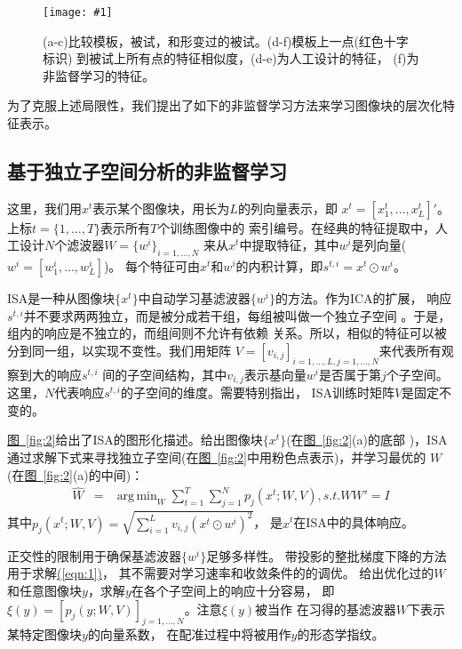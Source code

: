 \documentclass[a4paper]{article}
\newcommand{\addplot}[1]{\centering
	\texttt{[image: \#1]}}
\numberwithin{equation}{section}
\DeclareMathOperator*{\argmin}{arg\,min}
\newcommand{\figref}[1]{\hyperref[fig:#1]{\figurename~\ref*{fig:#1}}}
\newcommand{\eqnref}[1]{\hyperref[eqn:#1]{(\ref*{eqn:#1})}}
\renewcommand{\figurename}{图}
\begin{document}
\begin{figure}
    \addplot{res/fig1.png}
    \caption{(a-c)比较模板，被试，和形变过的被试。(d-f)模板上一点(红色十字标识)
        到被试上所有点的特征相似度，(d-e)为人工设计的特征，
        (f)为非监督学习的特征。}
    \label{fig:1}
\end{figure}

为了克服上述局限性，我们提出了如下的非监督学习方法来学习图像块的层次化特征表示。

\subsection{基于独立子空间分析的非监督学习}
这里，我们用$x^t$表示某个图像块，用长为$L$的列向量表示，即
$x^t=[x_1^t,\dots,x_L^t]'$。上标$t=\{1,\dots,T\}$表示所有$T$个训练图像中的
索引编号。在经典的特征提取中，人工设计$N$个滤波器$W=\{w^i\}_{i=1,\dots,N}$
来从$x^t$中提取特征，其中$w^i$是列向量($w^i=[w_1^i,\dots,w_L^i]$)。
每个特征可由$x^t$和$w^i$的内积计算，即$s^{t,i}=x^t\odot w^i$。

ISA是一种从图像块$\{x^t\}$中自动学习基滤波器$\{w^i\}$的方法。作为ICA的扩展，
响应$s^{t,i}$并不要求两两独立，而是被分成若干组，每组被叫做一个独立子空间
\cite{hyvarinen2000emergence}。于是，组内的响应是不独立的，而组间则不允许有依赖
关系。所以，相似的特征可以被分到同一组，以实现不变性。我们用矩阵
$V=[v_{i,j}]_{i=1,\dots,L,j=1,\dots,N}$来代表所有观察到大的响应$s^{t,i}$
间的子空间结构，其中$v_{i,j}$表示基向量$w^i$是否属于第$j$个子空间。
这里，$N$代表响应$s^{t,i}$的子空间的维度。需要特别指出，
ISA训练时矩阵$V$是固定不变的\cite{le2011learning}。

\figref{2}给出了ISA的图形化描述。给出图像块$\{x^t\}$(在\figref{2}(a)的底部
)，ISA通过求解下式来寻找独立子空间(在\figref{2}中用粉色点表示)，并学习最优的
$W$(在\figref{2}(a)的中间)：
\begin{eqnarray}
    \hat{W} &=& \argmin_W \sum_{t=1}^T\sum_{j=1}^N p_j(x^t;W,V), s.t. WW'=I
    \label{eqn:1}
\end{eqnarray}
其中$p_j(x^t;W,V)=\sqrt{\sum_{i=1}^L v_{i,j}(x^t \odot w^i)^2}$，
是$x^t$在ISA中的具体响应。

正交性的限制用于确保基滤波器$\{w^i\}$足够多样性。
带投影的整批梯度下降的方法用于求解\eqnref{1}，
其不需要对学习速率和收敛条件的的调优\cite{le2011learning}。
给出优化过的$W$和任意图像块$y$，求解$y$在各个子空间上的响应十分容易，
即$\xi(y) = [p_j(y;W,V)]_{j=1,\ldots,N}$。注意$\xi(y)$被当作
在习得的基滤波器$W$下表示某特定图像块$y$的向量系数，
在配准过程中将被用作$y$的形态学指纹。
\end{document}
